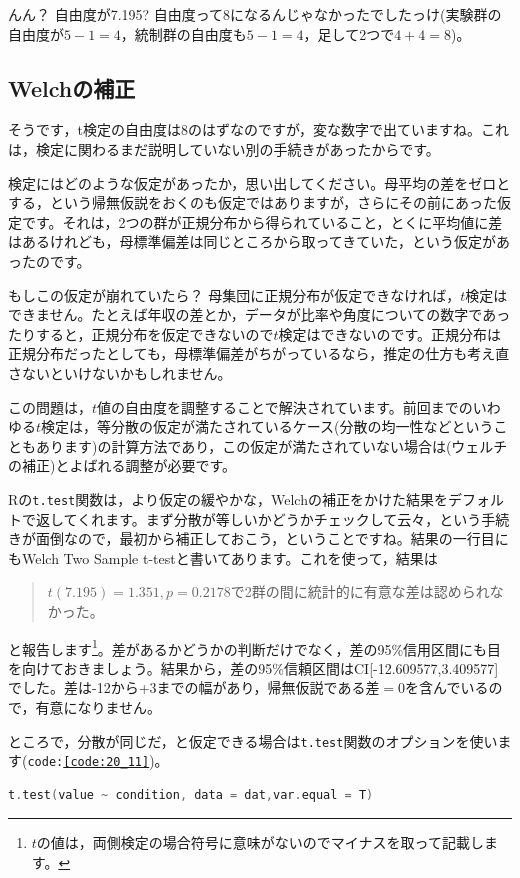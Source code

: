 \documentclass{ltjsbook}
\begin{document}
んん？ 自由度が7.195? 自由度って8になるんじゃなかったでしたっけ(実験群の自由度が$5-1=4$，統制群の自由度も$5-1=4$，足して2つで$4+4=8$)。

\subsection{Welchの補正}
そうです，t検定の自由度は$8$のはずなのですが，変な数字で出ていますね。これは，検定に関わるまだ説明していない別の手続きがあったからです。

検定にはどのような仮定があったか，思い出してください。母平均の差をゼロとする，という帰無仮説をおくのも仮定ではありますが，さらにその前にあった仮定です。それは，2つの群が正規分布から得られていること，とくに平均値に差はあるけれども，母標準偏差は同じところから取ってきていた，という仮定があったのです。

もしこの仮定が崩れていたら？ 母集団に正規分布が仮定できなければ，$t$検定はできません。たとえば年収の差とか，データが比率や角度についての数字であったりすると，正規分布を仮定できないので$t$検定はできないのです。正規分布は正規分布だったとしても，母標準偏差がちがっているなら，推定の仕方も考え直さないといけないかもしれません。

この問題は，$t$値の自由度を調整することで解決されています。前回までのいわゆる$t$検定は，等分散の仮定が満たされているケース(分散の均一性などということもあります)の計算方法であり，この仮定が満たされていない場合は(ウェルチの補正)とよばれる調整が必要です。

Rの\texttt{t.test}関数は，より仮定の緩やかな，Welchの補正をかけた結果をデフォルトで返してくれます。まず分散が等しいかどうかチェックして云々，という手続きが面倒なので，最初から補正しておこう，ということですね。結果の一行目にもWelch Two Sample t-testと書いてあります。これを使って，結果は
\begin{quote}
	$t(7.195)=1.351,p = 0.2178$で2群の間に統計的に有意な差は認められなかった。
\end{quote}
と報告します\footnote{$t$の値は，両側検定の場合符号に意味がないのでマイナスを取って記載します。}。差があるかどうかの判断だけでなく，差の95\%信用区間にも目を向けておきましょう。結果から，差の95\%信頼区間はCI[-12.609577,3.409577]でした。差は-12から+3までの幅があり，帰無仮説である差$=0$を含んでいるので，有意になりません。


ところで，分散が同じだ，と仮定できる場合は\texttt{t.test}関数のオプションを使います(\texttt{code:\ref{code:20_11}})。

\begin{lstlisting}[language=c++,label={code:20_11},caption={分散のオプション指定}]
t.test(value ~ condition, data = dat,var.equal = T)
\end{lstlisting}
\end{document}
